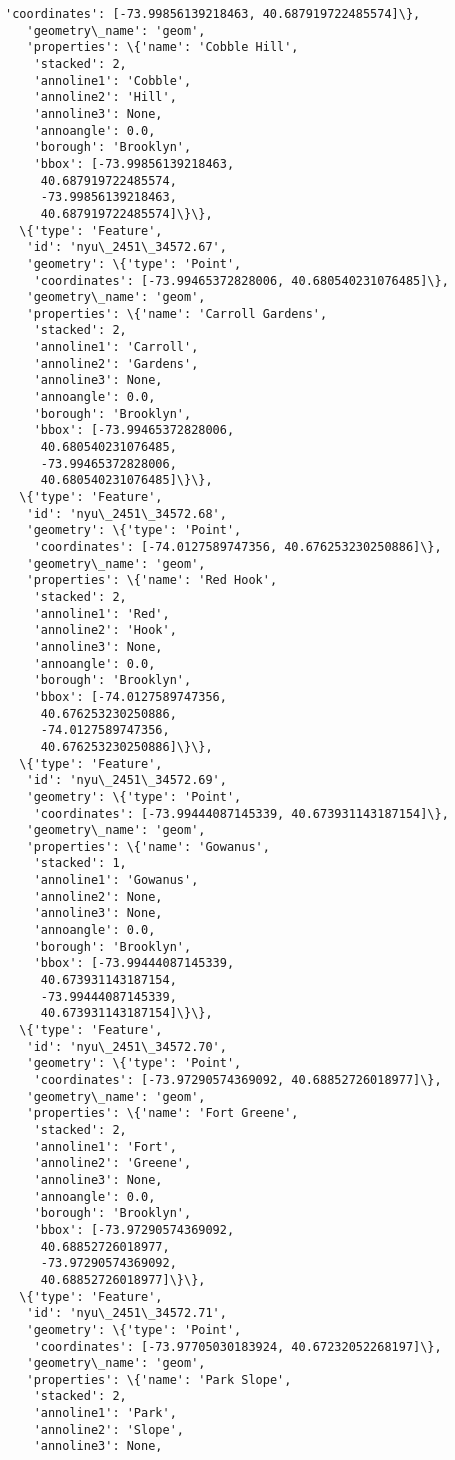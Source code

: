\documentclass[11pt]{article}
\begin{document}
\begin{tcolorbox}[breakable, size=fbox, boxrule=.5pt, pad at break*=1mm, opacityfill=0]
\begin{Verbatim}[commandchars=\\\{\}]
    'coordinates': [-73.99856139218463, 40.687919722485574]\},
   'geometry\_name': 'geom',
   'properties': \{'name': 'Cobble Hill',
    'stacked': 2,
    'annoline1': 'Cobble',
    'annoline2': 'Hill',
    'annoline3': None,
    'annoangle': 0.0,
    'borough': 'Brooklyn',
    'bbox': [-73.99856139218463,
     40.687919722485574,
     -73.99856139218463,
     40.687919722485574]\}\},
  \{'type': 'Feature',
   'id': 'nyu\_2451\_34572.67',
   'geometry': \{'type': 'Point',
    'coordinates': [-73.99465372828006, 40.680540231076485]\},
   'geometry\_name': 'geom',
   'properties': \{'name': 'Carroll Gardens',
    'stacked': 2,
    'annoline1': 'Carroll',
    'annoline2': 'Gardens',
    'annoline3': None,
    'annoangle': 0.0,
    'borough': 'Brooklyn',
    'bbox': [-73.99465372828006,
     40.680540231076485,
     -73.99465372828006,
     40.680540231076485]\}\},
  \{'type': 'Feature',
   'id': 'nyu\_2451\_34572.68',
   'geometry': \{'type': 'Point',
    'coordinates': [-74.0127589747356, 40.676253230250886]\},
   'geometry\_name': 'geom',
   'properties': \{'name': 'Red Hook',
    'stacked': 2,
    'annoline1': 'Red',
    'annoline2': 'Hook',
    'annoline3': None,
    'annoangle': 0.0,
    'borough': 'Brooklyn',
    'bbox': [-74.0127589747356,
     40.676253230250886,
     -74.0127589747356,
     40.676253230250886]\}\},
  \{'type': 'Feature',
   'id': 'nyu\_2451\_34572.69',
   'geometry': \{'type': 'Point',
    'coordinates': [-73.99444087145339, 40.673931143187154]\},
   'geometry\_name': 'geom',
   'properties': \{'name': 'Gowanus',
    'stacked': 1,
    'annoline1': 'Gowanus',
    'annoline2': None,
    'annoline3': None,
    'annoangle': 0.0,
    'borough': 'Brooklyn',
    'bbox': [-73.99444087145339,
     40.673931143187154,
     -73.99444087145339,
     40.673931143187154]\}\},
  \{'type': 'Feature',
   'id': 'nyu\_2451\_34572.70',
   'geometry': \{'type': 'Point',
    'coordinates': [-73.97290574369092, 40.68852726018977]\},
   'geometry\_name': 'geom',
   'properties': \{'name': 'Fort Greene',
    'stacked': 2,
    'annoline1': 'Fort',
    'annoline2': 'Greene',
    'annoline3': None,
    'annoangle': 0.0,
    'borough': 'Brooklyn',
    'bbox': [-73.97290574369092,
     40.68852726018977,
     -73.97290574369092,
     40.68852726018977]\}\},
  \{'type': 'Feature',
   'id': 'nyu\_2451\_34572.71',
   'geometry': \{'type': 'Point',
    'coordinates': [-73.97705030183924, 40.67232052268197]\},
   'geometry\_name': 'geom',
   'properties': \{'name': 'Park Slope',
    'stacked': 2,
    'annoline1': 'Park',
    'annoline2': 'Slope',
    'annoline3': None,

\end{Verbatim}
\end{tcolorbox}
\end{document}
